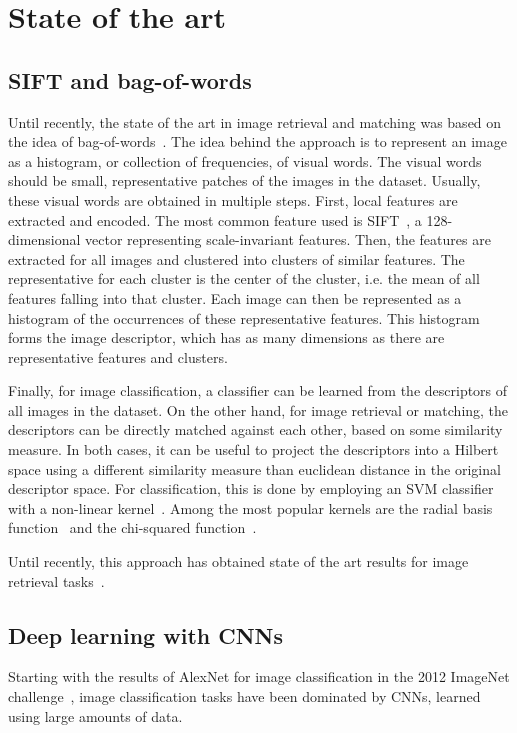 
\chapter{State of the art}
\section{SIFT and bag-of-words}
Until recently, the state of the art in image retrieval and matching
was based on the idea of
bag-of-words~\cite{philbin_object_2007,mikulik_learning_2013}.
The idea behind the approach is to represent an image as a histogram,
or collection of frequencies, of visual words. The visual words should
be small, representative patches of the images in the dataset.
Usually, these visual words are obtained in multiple steps. First,
local features are extracted and encoded. The most common feature used
is SIFT~\cite{lowe_distinctive_2004}, a 128-dimensional vector representing
scale-invariant features. Then, the features are extracted for all
images and clustered into clusters of similar features.
The representative for each cluster is the center of the cluster,
i.e. the mean of all features falling into that cluster.
Each image can then be represented as a histogram of the occurrences
of these representative features.
This histogram forms the image descriptor, which has as many dimensions
as there are representative features and clusters.

Finally, for image classification, a classifier can be learned from the
descriptors of all images in the dataset. On the other hand, for image
retrieval or matching, the descriptors can be directly matched against
each other, based on some similarity measure.
In both cases, it can be useful to project the descriptors into a Hilbert
space using a different similarity measure than euclidean distance
in the original descriptor space.
For classification, this is done by employing an SVM classifier with a
non-linear kernel~\cite{shawe-taylor_kernel_2004}.
Among the most popular kernels are the
radial basis function~\cite{scholkopf_comparing_1997}
and the chi-squared function~\cite{vedaldi_efficient_2012}.

Until recently, this approach has obtained state of the art results for
image retrieval tasks~\cite{mikulik_learning_2013}.

\section{Deep learning with CNNs}
Starting with the results of AlexNet for image classification in the 2012
ImageNet challenge~\cite{krizhevsky_imagenet_2012,russakovsky_imagenet_2015},
image classification tasks have been dominated by CNNs, learned using
large amounts of data.

